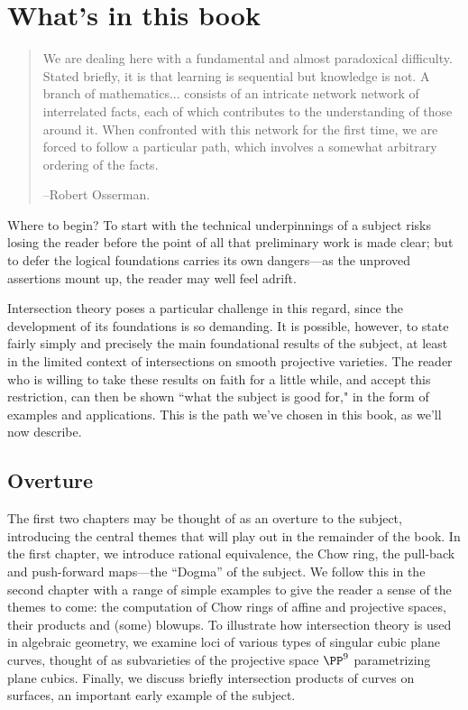 \section{What's in this book}


\begin{quote}
\small\sf
We are dealing here with a fundamental and almost paradoxical difficulty. Stated briefly, it is that learning is sequential but knowledge is not. A branch of mathematics... consists of an intricate network network of interrelated facts, each of which contributes to the understanding of those around it. When confronted with this network for the first time, we are forced to follow a particular path, which involves a somewhat arbitrary ordering of the facts.

--Robert Osserman.

\end{quote}



Where to begin? To start with the technical underpinnings of a subject risks losing the reader before the point of all that preliminary work is made clear; but to defer the logical foundations carries its own dangers---as the unproved assertions mount up, the reader may well feel adrift.

Intersection theory poses a particular challenge in this regard, since the development of its foundations is so demanding. It is possible, however, to state fairly simply and precisely the main foundational results of the subject, at least in the limited context of intersections on smooth projective varieties. The reader who is willing to take these results on faith for a little while, and accept this restriction, can then be shown ``what the subject is good for," in the form of examples and applications. This is the path we've chosen in this book, as we'll now describe.

\subsection{Overture}

The first two chapters may be thought of as an overture to the subject, introducing the central themes that will play out in the remainder of the book. 
In the first chapter, we introduce rational equivalence, the Chow ring, the pull-back and push-forward maps---the ``Dogma'' of the subject. We follow this in the second chapter with a range of simple examples to give the reader a sense of the themes to come: the computation of Chow rings of affine and projective spaces, their products and (some) blowups. To illustrate how intersection theory is used in algebraic geometry, we examine loci of various types of singular cubic plane curves, thought of as subvarieties of the projective space
$\PP^9$ parametrizing plane cubics. Finally, we discuss briefly intersection products of curves on surfaces, an important early example of the subject.

